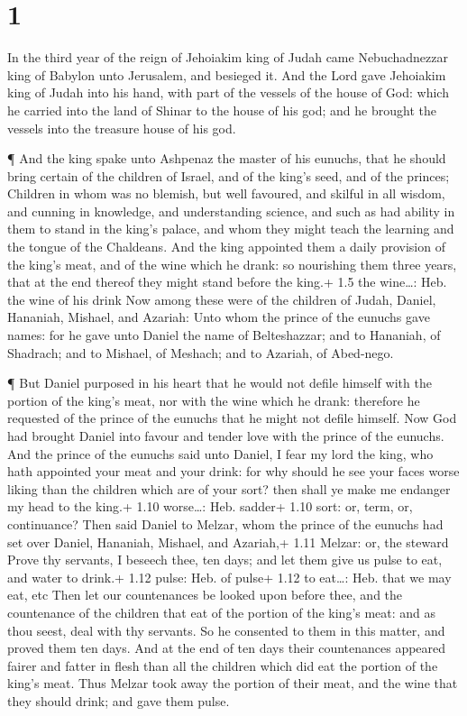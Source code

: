 \hypertarget{section}{%
\section{1}\label{section}}

 In the third year of the reign of Jehoiakim king of Judah
came Nebuchadnezzar king of Babylon unto Jerusalem, and besieged it.
 And the Lord gave Jehoiakim king of Judah into his hand,
with part of the vessels of the house of God: which he carried into the
land of Shinar to the house of his god; and he brought the vessels into
the treasure house of his god.

 ¶ And the king spake unto Ashpenaz the master of his
eunuchs, that he should bring certain of the children of Israel, and of
the king's seed, and of the princes;  Children in whom was
no blemish, but well favoured, and skilful in all wisdom, and cunning in
knowledge, and understanding science, and such as had ability in them to
stand in the king's palace, and whom they might teach the learning and
the tongue of the Chaldeans.  And the king appointed them a
daily provision of the king's meat, and of the wine which he drank: so
nourishing them three years, that at the end thereof they might stand
before the king.+ 1.5 the wine\ldots: Heb. the wine of his drink
 Now among these were of the children of Judah, Daniel,
Hananiah, Mishael, and Azariah:  Unto whom the prince of the
eunuchs gave names: for he gave unto Daniel the name of Belteshazzar;
and to Hananiah, of Shadrach; and to Mishael, of Meshach; and to
Azariah, of Abed-nego.

 ¶ But Daniel purposed in his heart that he would not defile
himself with the portion of the king's meat, nor with the wine which he
drank: therefore he requested of the prince of the eunuchs that he might
not defile himself.  Now God had brought Daniel into favour
and tender love with the prince of the eunuchs.  And the
prince of the eunuchs said unto Daniel, I fear my lord the king, who
hath appointed your meat and your drink: for why should he see your
faces worse liking than the children which are of your sort? then shall
ye make me endanger my head to the king.+ 1.10 worse\ldots: Heb. sadder+
1.10 sort: or, term, or, continuance?  Then said Daniel to
Melzar, whom the prince of the eunuchs had set over Daniel, Hananiah,
Mishael, and Azariah,+ 1.11 Melzar: or, the steward  Prove
thy servants, I beseech thee, ten days; and let them give us pulse to
eat, and water to drink.+ 1.12 pulse: Heb. of pulse+ 1.12 to eat\ldots:
Heb. that we may eat, etc  Then let our countenances be
looked upon before thee, and the countenance of the children that eat of
the portion of the king's meat: and as thou seest, deal with thy
servants.  So he consented to them in this matter, and
proved them ten days.  And at the end of ten days their
countenances appeared fairer and fatter in flesh than all the children
which did eat the portion of the king's meat.  Thus Melzar
took away the portion of their meat, and the wine that they should
drink; and gave them pulse.

